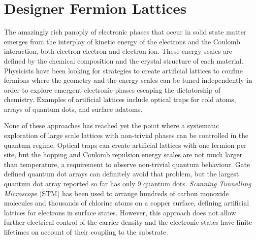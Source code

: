 \chapter{Designer Fermion Lattices}

The amazingly rich panoply of electronic phases that occur in solid state matter emerges from the interplay of kinetic energy of the electrons and the Coulomb interaction, both electron-electron and electron-ion. These energy scales are defined by the chemical composition and the crystal structure of each material. Physicists have been looking for strategies to create artificial lattices to confine fermions where the geometry and the energy scales can be tuned independently in order to explore emergent electronic phases escaping the dictatorship of chemistry.
Examples of artificial lattices include optical traps for cold atoms\cite{Cocchi2016}, arrays of quantum dots\cite{mortemousque2018,dehollain2019}, and surface adatoms\cite{gomes2012,drost2017,girovsky2017,khajetoorians2019}. 


None of these approaches has reached yet the point where a systematic exploration of large scale lattices with non-trivial phases can be controlled in the quantum regime.
Optical traps can create artificial lattices with one fermion per site, but the hopping and Coulomb repulsion energy scales are not much larger than temperature,\cite{Cocchi2016} a requirement to observe non-trivial quantum behaviour.
Gate defined quantum dot arrays can definitely avoid that problem\cite{dehollain2019}, but the largest quantum dot array reported so far has only 9 quantum dots\cite{mortemousque2018}.
\emph{Scanning Tunnelling Microscope} (STM) has been used to arrange hundreds of carbon monoxide molecules\cite{gomes2012} and thousands of chlorine atoms\cite{Kalff2016} on a copper surface, defining artificial lattices for electrons in surface states. However, this approach does not allow further electrical control of the carrier density and the electronic states have finite lifetimes on account of their coupling to the substrate. 

